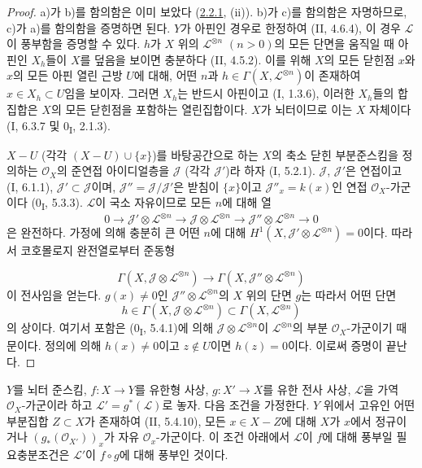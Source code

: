 \begin{proof}
a)가 b)를 함의함은 이미 보았다
(\hyperref[III.2.2.1-fr]{2.2.1}, (ii)). b)가 c)를 함의함은 자명하므로,
c)가 a)를 함의함을 증명하면 된다. $Y$가 아핀인 경우로 한정하여
(II, 4.6.4), 이 경우 $\mathcal L$이 풍부함을 증명할 수 있다.
$h$가 $X$ 위의 $\mathcal L^{\otimes n}$ $(n>0)$의 모든 단면을
움직일 때 아핀인 $X_h$들이 $X$를 덮음을 보이면 충분하다
(II, 4.5.2). 이를 위해 $X$의 모든 닫힌점 $x$와 $x$의 모든 아핀
열린 근방 $U$에 대해, 어떤 $n$과
$h\in\Gamma(X,\mathcal L^{\otimes n})$이 존재하여
$x\in X_h\subset U$임을 보이자. 그러면 $X_h$는 반드시 아핀이고
(I, 1.3.6), 이러한 $X_h$들의 합집합은 $X$의 모든 닫힌점을 포함하는
열린집합이다. $X$가 뇌터이므로 이는 $X$ 자체이다
(I, 6.3.7 및 0\textsubscript{I}, 2.1.3).

$X-U$ (각각 $(X-U)\cup\{x\}$)를 바탕공간으로 하는 $X$의 축소 닫힌
부분준스킴을 정의하는 $\mathcal O_X$의 준연접 아이디얼층을
$\mathcal J$ (각각 $\mathcal J'$)라 하자 (I, 5.2.1).
$\mathcal J$, $\mathcal J'$은 연접이고 (I, 6.1.1),
$\mathcal J'\subset\mathcal J$이며,
$\mathcal J''=\mathcal J/\mathcal J'$은 받침이 $\{x\}$이고
$\mathcal J''_x=k(x)$인 연접 $\mathcal O_X$-가군이다
(0\textsubscript{I}, 5.3.3). $\mathcal L$이 국소 자유이므로 모든 $n$에
대해 열
\[
0\to\mathcal J'\otimes\mathcal L^{\otimes n}
\to\mathcal J\otimes\mathcal L^{\otimes n}
\to\mathcal J''\otimes\mathcal L^{\otimes n}\to0
\]
은 완전하다. 가정에 의해 충분히 큰 어떤 $n$에 대해
$H^1(X,\mathcal J'\otimes\mathcal L^{\otimes n})=0$이다. 따라서
코호몰로지 완전열로부터 준동형

\[
\Gamma(X,\mathcal J\otimes\mathcal L^{\otimes n})
\longrightarrow
\Gamma(X,\mathcal J''\otimes\mathcal L^{\otimes n})
\]
이 전사임을 얻는다. $g(x)\neq0$인
$\mathcal J''\otimes\mathcal L^{\otimes n}$의 $X$ 위의 단면 $g$는
따라서 어떤 단면
\[
h\in\Gamma(X,\mathcal J\otimes\mathcal L^{\otimes n})
\subset\Gamma(X,\mathcal L^{\otimes n})
\]
의 상이다. 여기서 포함은 (0\textsubscript{I}, 5.4.1)에 의해
$\mathcal J\otimes\mathcal L^{\otimes n}$이
$\mathcal L^{\otimes n}$의 부분 $\mathcal O_X$-가군이기 때문이다.
정의에 의해 $h(x)\neq0$이고 $z\notin U$이면 $h(z)=0$이다. 이로써
증명이 끝난다.
\end{proof}

\begin{proposition}[2.6.2]
\label{III.2.6.2-fr}
$Y$를 뇌터 준스킴, $f:X\to Y$를 유한형 사상,
$g:X'\to X$를 유한 전사 사상, $\mathcal L$을 가역
$\mathcal O_X$-가군이라 하고 $\mathcal L'=g^*(\mathcal L)$로 놓자.
다음 조건을 가정한다. $Y$ 위에서 고유인 어떤 부분집합 $Z\subset X$가
존재하여 (II, 5.4.10), 모든 $x\in X-Z$에 대해 $X$가 $x$에서
정규이거나 $(g_*(\mathcal O_{X'}))_x$가 자유 $\mathcal O_x$-가군이다.
이 조건 아래에서 $\mathcal L$이 $f$에 대해 풍부일 필요충분조건은
$\mathcal L'$이 $f\circ g$에 대해 풍부인 것이다.
\end{proposition}


